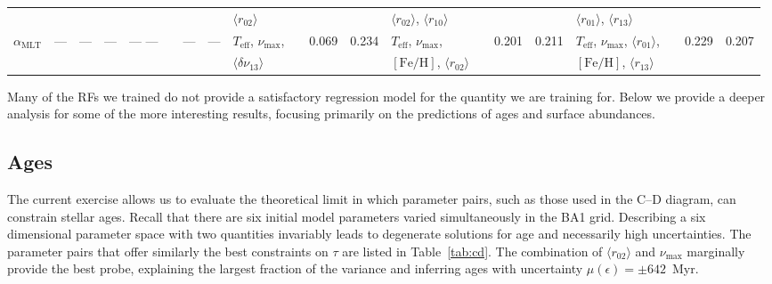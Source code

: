 {\begin{landscape}
\begin{table}
\begin{tabular}{  l | l  l  l | l  l  l  l | l  l  l  l | l  l  l  l | l  l  l  l   }
  &  &  &  &  &  &  &  &  $\langle r_{02}\rangle$ &  &  &  & $\langle r_{02}\rangle$, $\langle r_{10}\rangle$ &&  & & $\langle r_{01}\rangle$, $\langle r_{13}\rangle$ &  &  &\\[3pt] 
  $\alpha_{\text{MLT}}$ & --- & --- & --- & --- --- && --- & --- & $T_{\text{eff}}$, $\nu_{\max}$, && 0.069 & 0.234 & $T_{\text{eff}}$, $\nu_{\max}$, && 0.201 & 0.211 & $T_{\text{eff}}$, $\nu_{\max}$, $\langle r_{01}\rangle$, && 0.229 & 0.207\\
  &  &  &  &  &  &  &  &  $\langle\delta\nu_{13}\rangle$ &  &  &  & $[\text{Fe/H}]$, $\langle r_{02}\rangle$ &&  & & $[\text{Fe/H}]$, $\langle r_{13}\rangle$ &  &  &\\[3pt] 
%
 \end{tabular} 
 \end{table}
%
%
\end{landscape}
}
%

Many of the RFs we trained do not provide a satisfactory regression model for the quantity we are training for. Below we provide a deeper analysis for some of the more interesting results, focusing primarily on the predictions of ages and surface abundances. 

\subsection{Ages}
\label{sec:sages}
The current exercise allows us to evaluate the theoretical limit in which parameter pairs, such as those used in the C--D diagram, can constrain stellar ages. 
Recall that there are six initial model parameters varied simultaneously in the BA1 grid. 
Describing a six dimensional parameter space with two quantities invariably leads to degenerate solutions for age and necessarily high uncertainties.
The parameter pairs that offer similarly the best constraints on $\tau$ are listed in Table~\ref{tab:cd}. The combination of ${\langle r_{02}\rangle}$ and $\nu_{\max}$  marginally provide the best probe, explaining the largest fraction of the variance and inferring ages with uncertainty ${\mu (\epsilon) = \pm 642}$~Myr.  

